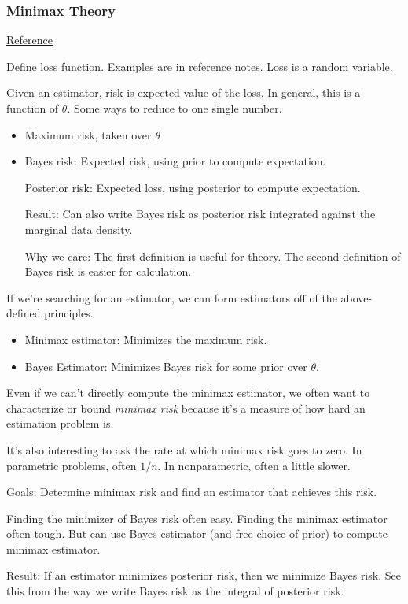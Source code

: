 \documentclass[12pt]{article}
\theoremstyle{plain}
\theoremstyle{definition}
\theoremstyle{remark}
\begin{document}
\subsubsection{Minimax Theory}


\href{http://www.stat.cmu.edu/~larry/=stat705/Lecture8.pdf}{Reference}


Define loss function. Examples are in reference notes.
Loss is a random variable.

Given an estimator, risk is expected value of the loss.
In general, this is a function of $\theta$.
Some ways to reduce to one single number.
\begin{itemize}
  \item Maximum risk, taken over $\theta$
  \item Bayes risk:
    Expected risk, using prior to compute expectation.

    Posterior risk:
    Expected loss, using posterior to compute expectation.

    Result:
    Can also write Bayes risk as posterior risk integrated against the
    marginal data density.

    Why we care:
    The first definition is useful for theory.
    The second definition of Bayes risk is easier for calculation.
\end{itemize}
If we're searching for an estimator, we can form estimators off of the
above-defined principles.
\begin{itemize}
  \item Minimax estimator: Minimizes the maximum risk.
  \item Bayes Estimator: Minimizes Bayes risk for some prior over
    $\theta$.
\end{itemize}
Even if we can't directly compute the minimax estimator, we often want
to characterize or bound \emph{minimax risk} because it's a measure of
how hard an estimation problem is.

It's also interesting to ask the rate at which minimax risk goes to
zero.
In parametric problems, often $1/n$. In nonparametric, often a little
slower.

Goals:
Determine minimax risk and find an estimator that achieves this risk.

Finding the minimizer of Bayes risk often easy.
Finding the minimax estimator often tough.
But can use Bayes estimator (and free choice of prior) to compute
minimax estimator.

Result:
If an estimator minimizes posterior risk, then we minimize Bayes risk.
See this from the way we write Bayes risk as the integral of posterior
risk.
\end{document}
